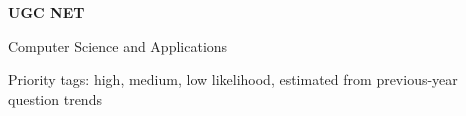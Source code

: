 \documentclass[11pt,a4paper,oneside]{book}
\begin{document}
\frontmatter
\hypersetup{pageanchor=false}
\begin{titlepage}\centering\vspace*{5cm}
{\Huge\bfseries UGC NET\par\medskip Computer Science and Applications\par}
\vspace{1cm}{\LARGE Unit-wise Practice Questions\par}
\vspace{2cm}{\large Paper II pattern: 2 marks each, no negative marking\par}
\vfill{\large Priority tags:  high,  medium,  low
likelihood, estimated from previous-year question trends\par}
\end{titlepage}
\hypersetup{pageanchor=true}
\tableofcontents
\mainmatter







\end{document}
